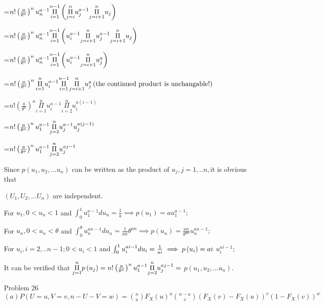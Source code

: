 \documentclass{article}
\begin{document}
=$n!\left( \frac{a}{\theta ^{a}}\right) ^{n}u_{n}^{a-1}\underset{i=1}{%
\overset{n-1}{\Pi }}\left( \underset{j=i}{\overset{n}{\Pi }}u_{j}^{a-1}%
\underset{j=i+1}{\overset{n}{\Pi }}u_{j}\right) $

=$n!\left( \frac{a}{\theta ^{a}}\right) ^{n}u_{n}^{a-1}\underset{i=1}{%
\overset{n-1}{\Pi }}\left( u_{i}^{a-1}\underset{j=i+1}{\overset{n}{\Pi }}%
u_{j}^{a-1}\underset{j=i+1}{\overset{n}{\Pi }}u_{j}\right) $

=$n!\left( \frac{a}{\theta ^{a}}\right) ^{n}u_{n}^{a-1}\underset{i=1}{%
\overset{n-1}{\Pi }}\left( u_{i}^{a-1}\underset{j=i+1}{\overset{n}{\Pi }}%
u_{j}^{a}\right) $

=$n!\left( \frac{a}{\theta ^{a}}\right) ^{n}\underset{i=1}{\overset{n}{\Pi }}%
u_{i}^{a-1}\underset{i=1}{\overset{n-1}{\Pi }}\underset{j=i+1}{\overset{n}{%
\Pi }}u_{j}^{a}\left( \text{the continued product is unchangable!}\right) $

=$n!\left( \frac{a}{\theta ^{a}}\right) ^{n}\underset{i=1}{\overset{n}{\Pi }}%
u_{i}^{a-1}\underset{i=2}{\overset{n}{\Pi }}u_{i}^{a\left( i-1\right) }$

=$n!\left( \frac{a}{\theta ^{a}}\right) ^{n}u_{1}^{a-1}\underset{j=2}{%
\overset{n}{\Pi }}u_{j}^{a-1}u_{j}^{a\left( j-1\right) }$

=$n!\left( \frac{a}{\theta ^{a}}\right) ^{n}u_{1}^{a-1}\underset{j=2}{%
\overset{n}{\Pi }}u_{j}^{aj-1}$

Since $p\left( u_{1},u_{2},...u_{n}\right) $ can be written as the product
of $u_{j},j=1,..n,$it is obvious that 

$\left( U_{1},U_{2},...U_{n}\right) $ are independent.

\bigskip For $u_{1},0<u_{n}<1$ and $\int_{0}^{1}u_{1}^{a-1}du_{n}=\frac{1}{a}%
\implies p\left( u_{1}\right) =au_{1}^{a-1};$

For $u_{n},0<u_{n}<\theta $ and $\int_{0}^{\theta }u_{n}^{an-1}du_{n}=\frac{1%
}{an}\theta ^{an}\implies p\left( u_{n}\right) =\frac{an}{\theta ^{an}}%
u_{n}^{an-1};$

For $u_{i},i=2,..n-1;0<u_{i}<1$ and $\int_{0}^{1}u_{i}^{ai-1}du_{i}=\frac{1}{%
ai}\implies p\left( u_{i}\right) =ai$ $u_{i}^{ai-1};$

It can be verified that $\underset{j=1}{\overset{n}{\Pi }}p\left(
u_{j}\right) =n!\left( \frac{a}{\theta ^{a}}\right) ^{n}u_{1}^{a-1}\underset{%
j=2}{\overset{n}{\Pi }}u_{j}^{aj-1}=$ $p\left( u_{1},u_{2},...u_{n}\right) .$

Problem 26$\left( a\right) P\left( U=u,V=v,n-U-V=w\right) =\binom{n}{u}%
F_{X}\left( u\right) ^{u}\binom{n-u}{v}\left( F_{X}\left( v\right)
-F_{X}\left( u\right) \right) ^{v}\left( 1-F_{X}\left( v\right) \right) ^{w}$
\end{document}
